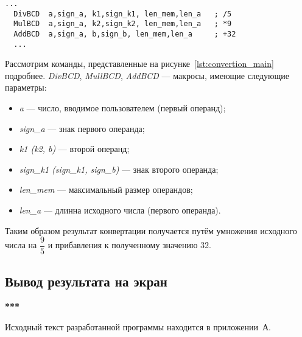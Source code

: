 \begin{lstlisting}[caption={Последовательность конвертации с использованием макроподстановок в языке Ассемблер},
label=lst:convertion_main,language={[x86masm]Assembler},basicstyle=\scriptsize\ttfamily]
  ...
  DivBCD  a,sign_a, k1,sign_k1, len_mem,len_a   ; /5
  MulBCD  a,sign_a, k2,sign_k2, len_mem,len_a   ; *9
  AddBCD  a,sign_a, b,sign_b, len_mem,len_a     ; +32
  ...
\end{lstlisting}

Рассмотрим команды, представленные на рисунке~\ref{lst:convertion_main} подробнее.
\textit{DivBCD}, \textit{MullBCD}, \textit{AddBCD} --- макросы, имеющие следующие параметры:
\begin{itemize}

  \item \textit{a} --- число, вводимое пользователем (первый операнд);
  \item \textit{sign\_a} --- знак первого операнда;
  \item \textit{k1 (k2, b)} --- второй операнд;
  \item \textit{sign\_k1 (sign\_k1, sign\_b)} ---  знак второго операнда;
  \item \textit{len\_mem} --- максимальный размер операндов;
  \item \textit{len\_a} --- длинна исходного числа (первого операнда).

\end{itemize}

Таким образом результат конвертации получается путём умножения исходного числа на $\dfrac{9}{5}$ и
прибавления к полученному значению 32.


\subsection{Вывод результата на экран}

\textbf{***}


Исходный текст разработанной программы находится в приложении~А.

